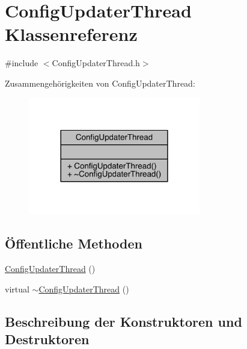 \hypertarget{class_config_updater_thread}{}\section{Config\+Updater\+Thread Klassenreferenz}
\label{class_config_updater_thread}


{\ttfamily \#include $<$Config\+Updater\+Thread.\+h$>$}



Zusammengehörigkeiten von Config\+Updater\+Thread\+:
\nopagebreak
\begin{figure}[H]
\begin{center}
\leavevmode
\includegraphics[width=213pt]{class_config_updater_thread__coll__graph}
\end{center}
\end{figure}
\subsection*{Öffentliche Methoden}
\begin{DoxyCompactItemize}
\item 
\hyperlink{class_config_updater_thread_a4ff1049db02d7dba1fff966487689fac}{Config\+Updater\+Thread} ()
\item 
virtual \hyperlink{class_config_updater_thread_a76b9050ee3e35fc85fd1b12eb2cb3ca4}{$\sim$\+Config\+Updater\+Thread} ()
\end{DoxyCompactItemize}


\subsection{Beschreibung der Konstruktoren und Destruktoren}
\hypertarget{class_config_updater_thread_a4ff1049db02d7dba1fff966487689fac}{}\label{class_config_updater_thread_a4ff1049db02d7dba1fff966487689fac} 
